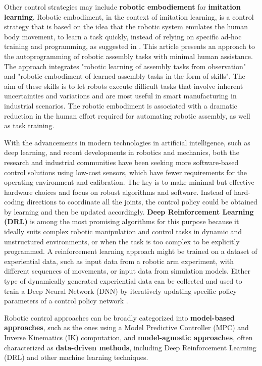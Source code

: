 Other control strategies may include \textbf{robotic embodiement} for \textbf{imitation learning}.
Robotic embodiment, in the context of imitation learning, is a control strategy that is based on the idea that the
robotic system emulates the human body movement, to learn a task quickly, instead of
relying on specific ad-hoc training and programming, as suggested in \cite{ji2021manufacturing}.
This article presents an approach to the autoprogramming of robotic assembly
tasks with minimal human assistance. The approach integrates
"robotic learning of assembly tasks from observation" and
"robotic embodiment of learned assembly tasks in the form of
skills". The aim of these skills is to let robots execute difficult tasks that involve inherent
uncertainties and variations and are most useful in smart manufacturing in industrial
scenarios. The robotic embodiment is associated with a dramatic reduction in
the human effort required for automating robotic assembly, as well as task training.

With the advancements in modern technologies in artificial intelligence, such as
deep learning, and recent developments in robotics and mechanics, both the research
and industrial communities have been seeking more software-based control solutions
using low-cost sensors, which have fewer requirements for the operating environment and
calibration. The key is to make minimal but effective hardware choices and focus on robust
algorithms and software. Instead of hard-coding directions to coordinate all the joints,
the control policy could be obtained by learning and then be updated accordingly. \textbf{Deep
	Reinforcement Learning (DRL)} is among the most promising algorithms for this purpose
because it ideally suits complex robotic manipulation and control tasks in dynamic and
unstructured environments, or when the task is too complex to be explicitly programmed.
A reinforcement learning approach might be trained on a dataset of experiential data, such as
input data from a robotic arm experiment, with different sequences of movements, or input data
from simulation models. Either type of dynamically generated experiential data can be
collected and used to train a Deep Neural Network (DNN) by iteratively updating specific
policy parameters of a control policy network \cite{liu2021deep}.

Robotic control approaches can be broadly categorized into \textbf{model-based approaches}, such as
the ones using a Model Predictive Controller (MPC) and Inverse Kinematics (IK) computation,
and \textbf{model-agnostic approaches}, often characterized as \textbf{data-driven methods},
including Deep Reinforcement Learning (DRL) and other machine learning techniques.

